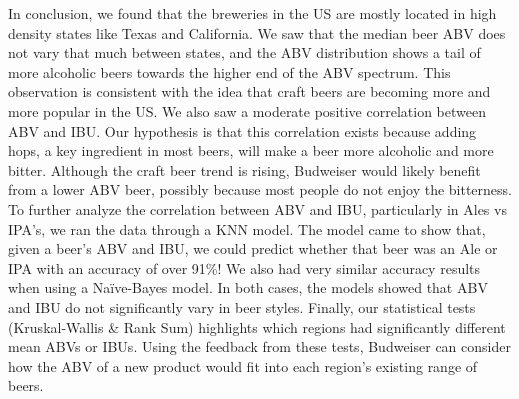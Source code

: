 \documentclass[
]{article}
\begin{document}
In conclusion, we found that the breweries in the US are mostly located
in high density states like Texas and California. We saw that the median
beer ABV does not vary that much between states, and the ABV
distribution shows a tail of more alcoholic beers towards the higher end
of the ABV spectrum. This observation is consistent with the idea that
craft beers are becoming more and more popular in the US. We also saw a
moderate positive correlation between ABV and IBU. Our hypothesis is
that this correlation exists because adding hops, a key ingredient in
most beers, will make a beer more alcoholic and more bitter. Although
the craft beer trend is rising, Budweiser would likely benefit from a
lower ABV beer, possibly because most people do not enjoy the
bitterness. To further analyze the correlation between ABV and IBU,
particularly in Ales vs IPA's, we ran the data through a KNN model. The
model came to show that, given a beer's ABV and IBU, we could predict
whether that beer was an Ale or IPA with an accuracy of over 91\%! We
also had very similar accuracy results when using a Naïve-Bayes model.
In both cases, the models showed that ABV and IBU do not significantly
vary in beer styles. Finally, our statistical tests (Kruskal-Wallis \&
Rank Sum) highlights which regions had significantly different mean ABVs
or IBUs. Using the feedback from these tests, Budweiser can consider how
the ABV of a new product would fit into each region's existing range of
beers.
\end{document}
